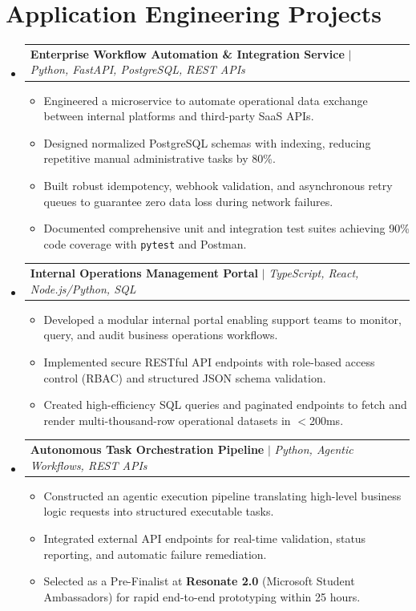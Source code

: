 \documentclass[letterpaper,10pt]{article}
\makeatletter
\newcommand{\resumeItem}[1]{
  \item\small{
    {#1 \vspace{-2pt}}
  }
}
\newcommand{\resumeProjectHeading}[2]{
    \item
    \begin{tabular*}{1.0\textwidth}[t]{l@{\extracolsep{\fill}}r}
      \small#1 & \textbf{\small #2}\\
    \end{tabular*}\vspace{-4pt}
}
\newcommand{\resumeSubHeadingListStart}{\begin{itemize}[leftmargin=0.0in, label={}]}
\newcommand{\resumeSubHeadingListEnd}{\end{itemize}}
\newcommand{\resumeItemListStart}{\begin{itemize}[leftmargin=0.15in, label=\raisebox{0.15ex}{\tiny$\bullet$}, itemsep=1.5pt]}
\newcommand{\resumeItemListEnd}{\end{itemize}\vspace{-3pt}}
\makeatother
\begin{document}
\section{Application Engineering Projects}
    \resumeSubHeadingListStart

      \resumeProjectHeading
          {\textbf{Enterprise Workflow Automation \& Integration Service} $|$ \emph{Python, FastAPI, PostgreSQL, REST APIs}}{}
          \resumeItemListStart
            \resumeItem{Engineered a microservice to automate operational data exchange between internal platforms and third-party SaaS APIs.}
            \resumeItem{Designed normalized PostgreSQL schemas with indexing, reducing repetitive manual administrative tasks by 80\%.}
            \resumeItem{Built robust idempotency, webhook validation, and asynchronous retry queues to guarantee zero data loss during network failures.}
            \resumeItem{Documented comprehensive unit and integration test suites achieving 90\% code coverage with \texttt{pytest} and Postman.}
          \resumeItemListEnd

      \resumeProjectHeading
          {\textbf{Internal Operations Management Portal} $|$ \emph{TypeScript, React, Node.js/Python, SQL}}{}
          \resumeItemListStart
            \resumeItem{Developed a modular internal portal enabling support teams to monitor, query, and audit business operations workflows.}
            \resumeItem{Implemented secure RESTful API endpoints with role-based access control (RBAC) and structured JSON schema validation.}
            \resumeItem{Created high-efficiency SQL queries and paginated endpoints to fetch and render multi-thousand-row operational datasets in $<$200ms.}
          \resumeItemListEnd

      \resumeProjectHeading
          {\textbf{Autonomous Task Orchestration Pipeline} $|$ \emph{Python, Agentic Workflows, REST APIs}}{}
          \resumeItemListStart
            \resumeItem{Constructed an agentic execution pipeline translating high-level business logic requests into structured executable tasks.}
            \resumeItem{Integrated external API endpoints for real-time validation, status reporting, and automatic failure remediation.}
            \resumeItem{Selected as a Pre-Finalist at \textbf{Resonate 2.0} (Microsoft Student Ambassadors) for rapid end-to-end prototyping within 25 hours.}
          \resumeItemListEnd

    \resumeSubHeadingListEnd

\end{document}
